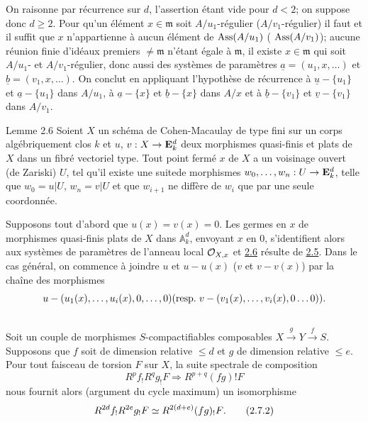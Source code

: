 \documentclass[10pt]{../fichiers-configuration-latex/smfart}
\begin{document}
On raisonne par récurrence sur $d$, l'assertion étant vide pour $d<2$;
on suppose donc $d\geq 2$. Pour qu'un élément $x\in \mathfrak{m}$ soit
$A/u_{1}$-régulier (\resp $A/v_{1}$-régulier) il faut et il
suffit que $x$ n'appartienne à aucun élément de $\operatorname{Ass}(A/u_{1})$ (\resp
$\operatorname{Ass}(A/v_{1})$); aucune réunion finie d'idéaux premiers $\neq \mathfrak{m}$
n'étant égale à $\mathfrak{m}$, il existe $x\in \mathfrak{m}$ qui soit $A/u_{1}$- et $A/v_{1}$-régulier, donc aussi des systèmes de paramètres
$\underline{a}=(u_{1},x,\ldots)$ et $\underline{b}=(v_{1},x,\ldots)$. On conclut en
appliquant l'hypothèse de récurrence à $\underline{u}-\{u_{1}\}$ et
$\underline{a}-\{u_{1}\}$ dans $A/u_{1}$, à $\underline{a}-\{x\}$ et
$\underline{b}-\{x\}$
dans $A/x$ et à $\underline{b}-\{v_{1}\}$ et $\underline{v}-\{v_{1}\}$ dans $A/v_{1}$.

\begin{enonce*}{Lemme 2.6}
Soient $X$ un schéma de Cohen-Macaulay de type fini sur un corps
algébriquement clos $k$ et $u$, $v:X\rightarrow \mathbf{E}^{d}_{k}$
deux morphismes quasi-finis et plats de $X$ dans un fibré vectoriel
type. Tout point fermé $x$ de $X$ a un voisinage ouvert (de Zariski)
$U$, tel qu'il existe une suite\pageoriginale de morphismes
$w_{0},\dots,w_{n}:U\rightarrow \mathbf{E}^{d}_{k}$, telle que $w_{0}=u|U$,
$w_{n}=v|U$ et que $w_{i+1}$ ne diffère de $w_{i}$ que par une seule
coordonnée.
\end{enonce*}

Supposons tout d'abord que $u(x)=v(x)=0$. Les germes en $x$ de
morphismes quasi-finis plats de $X$ dans $\mathbb A^{d}_{k}$,
envoyant $x$ en $0$, s'identifient alors aux systèmes de paramètres de
l'anneau local ${\mathcal O}_{X,x}$ et \hyperref[XVIII.lem2.6]{2.6} résulte de
\hyperref[XVIII.lem2.5]{2.5}. Dans le cas
général, on commence à joindre $u$ et $u-u(x)$ (\resp $v$ et $v-v(x)$)
par la chaîne des morphismes
$$
u-(u_{1}(x),\dots,u_{i}(x),0,\dots,0)(\text{resp.\kern.3em}
v-(v_{1}(x),\dots,v_{i}(x),0\dots 0)){}.
$$

\setcounter{subsection}{6}
\subsection{}
Soit un couple de morphismes $S$-compactifiables composables
$X\xrightarrow{g} Y\xrightarrow{f}S$. Supposons que $f$ soit de
dimension relative $\leq d$ et $g$ de dimension relative $\leq
e$. Pour tout faisceau de torsion $F$ sur $X$, la suite spectrale de
composition
\begin{equation*}
R^{p}f_{!}R^{q}g_{!}F\Longrightarrow R^{p+q}(fg)!F\tag{2.7.1}
\end{equation*}%
nous fournit alors (argument du cycle maximum) un isomorphisme
\begin{equation*}
R^{2d}f_{!}R^{2e}g_{!}F\simeq R^{2(d+e)}(fg)_{!}F{}.\tag{2.7.2}
\end{equation*}
\end{document}
